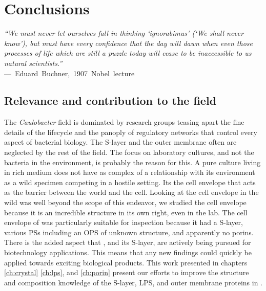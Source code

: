 
\acresetall
\resetlinenumber[1]
\chapter{Conclusions}
\label{ch:conclusions}
\begin{epigraph}
  \emph{``We must never let ourselves fall in thinking `ignorabimus' (`We shall never know'), but must have every confidence that the day will dawn when even those processes of life which are still a puzzle today will cease to be inaccessible to us natural scientists.''}\\ ---~Eduard~Buchner,~1907~Nobel~lecture 
\end{epigraph}
\section{Relevance and contribution to the field}\label{sec:relev-contr-field} 

The \textit{Caulobacter} field is dominated by research groups teasing apart the fine details of the \caulobacter{} lifecycle and the panoply of regulatory networks that control every aspect of bacterial biology. The \ac{S-layer}
 and the outer membrane often are neglected by the rest of the field. The focus on laboratory cultures, and not the bacteria in the environment, is probably the reason for this. A pure culture living in rich medium does not have as complex of a relationship with its environment as a wild specimen competing in a hostile setting. Its the cell envelope that acts as the barrier between the world and the cell. Looking at the \caulobacter cell envelope in the wild was well beyond the scope of this endeavor, we studied the cell envelope because it is an incredible structure in its own right, even in the lab. The cell envelope of \caulobacter{} was particularly suitable for inspection because it had a \acl{S-layer}, various \aclp{PS} including an \ac{OPS} of unknown structure, and apparently no porins. There is the added aspect that \caulobacter{}, and its \ac{S-layer}, are actively being pursued for biotechnology applications. This means that any new findings could quickly be applied towards exciting biological products. This work presented in chapters \ref{ch:crystal} \ref{ch:lps}, and \ref{ch:porin} present our efforts to improve the structure and composition knowledge of the \ac{S-layer}, \ac{LPS}, and outer membrane proteins in \caulobacter{}.
 
